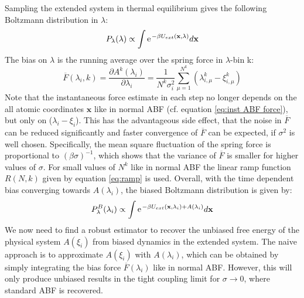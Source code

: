 Sampling the extended system in thermal equilibrium gives the following Boltzmann distribution in $\lambda$:
\begin{equation}
  P_\lambda(\lambda) \propto \int \e^{-\beta U_{ext}(\textbf{x},\lambda)} d\textbf{x} \\
\end{equation}
The bias on $\lambda$ is the running average over the spring force in $\lambda$-bin k:
\begin{equation}
  \overline{F}(\lambda_{i}, k) = \frac{\partial A^{k}(\lambda_{i})}{\partial \lambda_i} = \frac{1}{N^{k}\sigma_i^2} \sum_{\mu=1}^{N^{k}} (\lambda_{i,\mu}^{k}-\xi_{i,\mu}^{k})
  \label{eq:eABF bias}
\end{equation}
Note that the instantaneous force estimate in each step no longer depends on the all atomic coordinates $\textbf{x}$ like in normal ABF (cf. equation \ref{eq:inst ABF force}), but only on ($\lambda_i - \xi_i$).
This has the advantageous side effect, that the noise in $\overline{F}$ can be reduced significantly and faster convergence of $\overline{F}$ can be expected, if $\sigma^2$ is well chosen.\autocite{lesage2017smoothed} Specifically, the mean square fluctuation of the spring force is proportional to $(\beta\sigma)^{-1}$, which shows that the variance of $\overline{F}$ is smaller for higher values of $\sigma$.
For small values of $N^{k}$ like in normal ABF the linear ramp function $R(N,k)$ given by equation \ref{eq:ramp} is used. Overall, with the time dependent bias converging towards $A(\lambda_{i})$, the biased Boltzmann distribution is given by:
\begin{equation}
  P^B_\lambda(\lambda_i) \propto \int \e^{-\beta U_{ext}(\textbf{x},\lambda_i) + A(\lambda_i)} d\textbf{x}
\end{equation}
We now need to find a robust estimator to recover the unbiased free energy of the physical system $A(\xi_i)$ from biased dynamics in the extended system.
The naive approach is to approximate $A(\xi_i)$ with $A(\lambda_i)$, which can be obtained by simply integrating the bias force $\overline{F}(\lambda_{i})$ like in normal ABF.
However, this will only produce unbiased results in the tight coupling limit for $\sigma \rightarrow 0$, where standard ABF is recovered.

